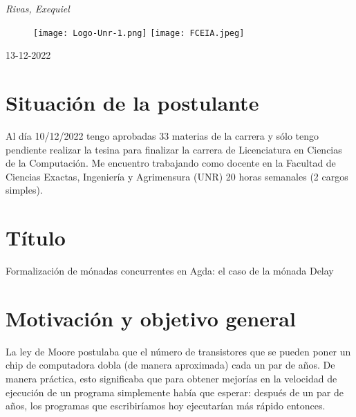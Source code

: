 \documentclass[11pt,a4paper]{article}
\begin{document}
\begin{titlepage}
    {\itshape\LARGE Rivas, Exequiel}
	
	\vspace{0.5\baselineskip} %
 
	\vspace*{6\baselineskip} %
    
    \begin{figure}[h] %
	\centering
	\texttt{[image: Logo-Unr-1.png]} \hfill \texttt{[image: FCEIA.jpeg]}
	\end{figure}
    
    \vfill %
	
		
	\vspace{0.3\baselineskip} %
	
	13-12-2022 %
	

\end{titlepage}



\section{Situación de la postulante}

Al día 10/12/2022 tengo aprobadas 33 materias de la carrera y sólo
tengo pendiente realizar la tesina para finalizar la carrera de
Licenciatura en Ciencias de la Computación. Me encuentro trabajando
como docente en la Facultad de Ciencias Exactas, Ingeniería y
Agrimensura (UNR) 20 horas semanales (2 cargos simples).

\section{Título}

Formalización de mónadas concurrentes en Agda: el caso de la mónada Delay

\section{Motivación y objetivo general}

La ley de Moore postulaba que el número de transistores que se pueden
poner un chip de computadora dobla (de manera aproximada) cada un par
de años. De manera práctica, esto significaba que para obtener
mejorías en la velocidad de ejecución de un programa simplemente había
que esperar: después de un par de años, los programas que escribiríamos
hoy ejecutarían más rápido entonces.
\end{document}
